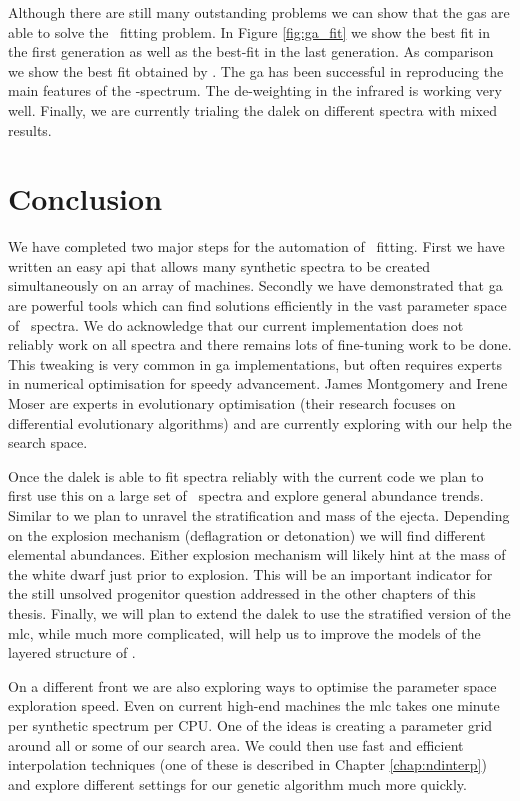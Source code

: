 Although there are still many outstanding problems we can show that the \glspl{ga} are able to solve the \sneia\ fitting problem. In Figure \ref{fig:ga_fit} we show the best fit in the first generation as well as the best-fit in the last generation. As comparison we show the best fit obtained by \citet{hachinger_dipl2007}. The \gls{ga} has been successful in reproducing the main features of the \sneia-spectrum. The de-weighting in the infrared is working very well. Finally, we are currently trialing the \gls{dalek} on different spectra with mixed results. 


\section{Conclusion}
\label{sec:dalek_conclusion}


We have completed two major steps for the automation of \sneia\ fitting. First we have written an easy \gls{api} that allows many synthetic spectra to be created simultaneously on an array of machines. Secondly we have demonstrated that \gls{ga} are powerful tools which can find solutions efficiently in the vast parameter space of \sneia\ spectra. We do acknowledge that our current implementation does not reliably work on all spectra and there remains lots of fine-tuning work to be done. This tweaking is very common in \gls{ga} implementations, but often requires experts in numerical optimisation for speedy advancement. James Montgomery and Irene Moser are experts in evolutionary optimisation (their research focuses on differential evolutionary algorithms) and are currently exploring with our help the search space. 

Once the \gls{dalek} is able to fit spectra reliably with the current code we plan to first use this on a large set of \sneia\ spectra and explore general abundance trends. Similar to \citet{2007Sci...315..825M} we plan to unravel the stratification and mass of the ejecta. Depending on the explosion mechanism (deflagration or detonation) we will find different elemental abundances. Either explosion mechanism will likely hint at the mass of the white dwarf just prior to explosion. This will be an important indicator for the still unsolved progenitor question addressed in the other chapters of this thesis. Finally, we will plan to extend the \gls{dalek} to use the stratified version of the \gls{mlc}, while much more complicated,  will help us to improve the models of the layered structure of \snia.

On a different front we are also exploring ways to optimise the parameter space exploration speed. Even on current high-end machines the \gls{mlc} takes one minute per synthetic spectrum per CPU. One of the ideas is creating a parameter grid around all or some of our search area. We could then use fast and efficient interpolation techniques (one of these is described in Chapter \ref{chap:ndinterp}) and explore different settings for our genetic algorithm much more quickly.

